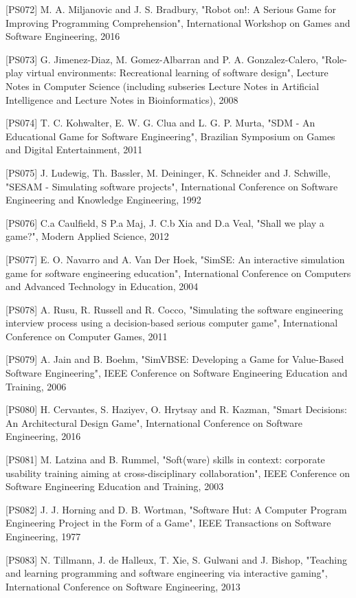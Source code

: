[PS072]	M. A. Miljanovic and J. S. Bradbury, "Robot on!: A Serious Game for Improving Programming Comprehension", International Workshop on Games and Software Engineering, 2016

[PS073]	G. Jimenez-Diaz, M. Gomez-Albarran and P. A. Gonzalez-Calero, "Role-play virtual environments: Recreational learning of software design", Lecture Notes in Computer Science (including subseries Lecture Notes in Artificial Intelligence and Lecture Notes in Bioinformatics), 2008

[PS074]	T. C. Kohwalter, E. W. G. Clua and L. G. P. Murta, "SDM - An Educational Game for Software Engineering", Brazilian Symposium on Games and Digital Entertainment, 2011

[PS075]	J. Ludewig, Th. Bassler, M. Deininger, K. Schneider and J. Schwille, "SESAM - Simulating software projects", International Conference on Software Engineering and Knowledge Engineering, 1992

[PS076]	C.a Caulfield, S P.a Maj, J. C.b Xia and D.a Veal, "Shall we play a game?", Modern Applied Science, 2012

[PS077]	E. O. Navarro and A. Van Der Hoek, "SimSE: An interactive simulation game for software engineering education", International Conference on Computers and Advanced Technology in Education, 2004

[PS078]	A. Rusu, R. Russell and R. Cocco, "Simulating the software engineering interview process using a decision-based serious computer game", International Conference on Computer Games, 2011

[PS079]	A. Jain and B. Boehm, "SimVBSE: Developing a Game for Value-Based Software Engineering", IEEE Conference on Software Engineering Education and Training, 2006

[PS080]	H. Cervantes, S. Haziyev, O. Hrytsay and R. Kazman, "Smart Decisions: An Architectural Design Game", International Conference on Software Engineering, 2016

[PS081]	M. Latzina and B. Rummel, "Soft(ware) skills in context: corporate usability training aiming at cross-disciplinary collaboration", IEEE Conference on Software Engineering Education and Training, 2003

[PS082]	J. J. Horning and D. B. Wortman, "Software Hut: A Computer Program Engineering Project in the Form of a Game", IEEE Transactions on Software Engineering, 1977

[PS083]	N. Tillmann, J. de Halleux, T. Xie, S. Gulwani and J. Bishop, "Teaching and learning programming and software engineering via interactive gaming", International Conference on Software Engineering, 2013

